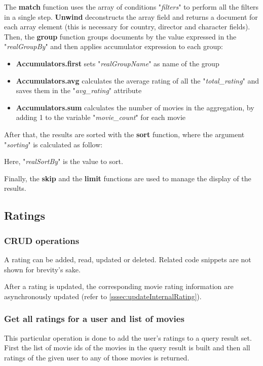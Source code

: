 \documentclass[11pt]{article}
\begin{document}
The \textbf{match} function uses the array of conditions "\textit{filters}" to perform all the filters in a single step. \textbf{Unwind} deconstructs the array field and returns a document for each array element (this is necessary for country, director and character fields). Then, the \textbf{group} function groups documents by the value expressed in the "\textit{realGroupBy}" and then applies accumulator expression to each group:
\begin{itemize}
	\item \textbf{Accumulators.first} sets "\textit{realGroupName}" as name of the group
	\item \textbf{Accumulators.avg} calculates the average rating of all the "\textit{total\_rating}" and saves them in the "\textit{avg\_rating}" attribute
	\item \textbf{Accumulators.sum} calculates the number of movies in the aggregation, by adding 1 to the variable "\textit{movie\_count}" for each movie
\end{itemize}
After that, the results are sorted with the \textbf{sort} function, where the argument "\textit{sorting}" is calculated as follow:



Here, "\textit{realSortBy}" is the value to sort.

Finally, the \textbf{skip} and the \textbf{limit} functions are used to manage the display of the results.

\subsection{Ratings}
\subsubsection{CRUD operations}
A rating can be added, read, updated or deleted. Related code snippets are not shown for brevity's sake.

After a rating is updated, the corresponding movie rating information are asynchronously updated (refer to \ref{sssec:updateInternalRating}).

\subsubsection{Get all ratings for a user and list of movies}
\label{sssec:userratings}
This particular operation is done to add the user's ratings to a query result set. First the list of movie ids of the movies in the query result is built and then all ratings of the given user to any of those movies is returned.
\end{document}
